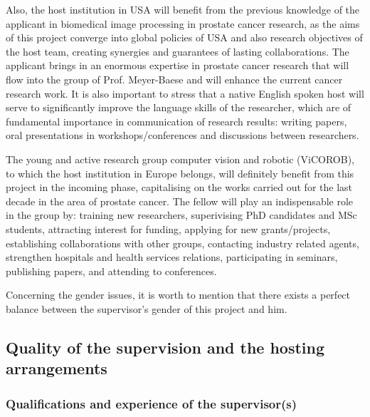 Also, the host institution in USA will benefit from the previous knowledge of the applicant in biomedical image processing in prostate cancer research, as the aims of this project converge into global policies of USA and also research objectives of the host team, creating synergies and guarantees of lasting collaborations. The applicant brings in an enormous expertise in prostate cancer research that will flow into the group of Prof. Meyer-Baese and will enhance the current cancer research work. It is also important to stress that a native English spoken host will serve to significantly improve the language skills of the researcher, which are of fundamental importance in communication of research results: writing papers, oral presentations in workshops/conferences and discussions between researchers.

The young and active research group computer vision and robotic (ViCOROB), to which the host institution in Europe belongs, will definitely benefit from this project in the incoming phase, capitalising on the works carried out for the last decade in the area of prostate cancer. The fellow will play an indispensable role in the group by: training new researchers, superivising PhD candidates and MSc students, attracting interest for funding, applying for new grants/projects,  establishing collaborations with other groups, contacting industry related agents, strengthen hospitals and health services relations, participating in seminars, publishing papers, and attending to conferences.

Concerning the gender issues, it is worth to mention that there exists a perfect balance between the supervisor's gender of this project and him.

\subsection{Quality of the supervision and the hosting arrangements}
\label{sec:supervision}

\subsubsection*{Qualifications and experience of the supervisor(s)}

